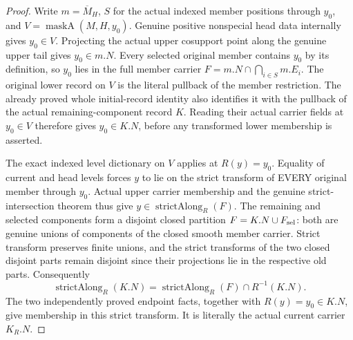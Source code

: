 \begin{proof}
Write $m=\overline M_H$, $S$ for the actual indexed member positions
through $y_0$, and $V=\operatorname{maskA}(M,H,y_0)$. Genuine positive
nonspecial head data internally gives $y_0\in V$. Projecting the actual
upper cosupport point along the genuine upper tail gives $y_0\in m.N$.
Every selected original member contains $y_0$ by its definition, so
$y_0$ lies in the full member carrier $F=m.N\cap\bigcap_{i\in S}m.E_i$.
The original lower record on $V$ is the literal pullback of the member
restriction. The already proved whole initial-record identity also
identifies it with the pullback of the actual remaining-component
record $K$. Reading their actual carrier fields at $y_0\in V$ therefore
gives $y_0\in K.N$, before any transformed lower membership is asserted.

The exact indexed level dictionary on $V$ applies at $R(y)=y_0$.
Equality of current and head levels forces $y$ to lie on the strict
transform of EVERY original member through $y_0$. Actual upper carrier
membership and the genuine strict-intersection theorem thus give
$y\in\operatorname{strictAlong}_R(F)$.
The remaining and selected components form a disjoint closed partition
$F=K.N\cup F_{\rm sel}$: both are genuine unions of components of the
closed smooth member carrier. Strict transform preserves finite unions,
and the strict transforms of the two closed disjoint parts remain
disjoint since their projections lie in the respective old parts.
Consequently
\[
 \operatorname{strictAlong}_R(K.N)
 =\operatorname{strictAlong}_R(F)\cap R^{-1}(K.N).
\]
The two independently proved endpoint facts, together with
$R(y)=y_0\in K.N$, give membership in this strict transform. It is
literally the actual current carrier $K_R.N$.
\end{proof}

